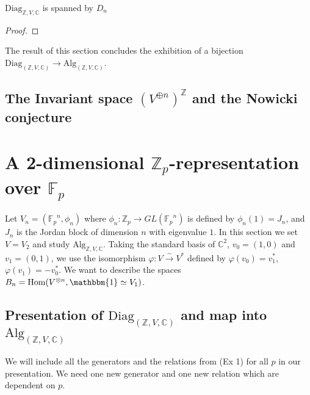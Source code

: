 \documentclass[11pt]{article} %
\begin{document}
\begin{prop}
$\text{Diag}_{\mathbb{Z},V,\mathbb{C}}$ is spanned by $D_n$
\end{prop}
\begin{proof}

\end{proof}
The result of this section concludes the exhibition of a bijection $\text{Diag}_{(\mathbb{Z},V,\mathbb{C})} \rightarrow \text{Alg}_{(\mathbb{Z},V,\mathbb{C})}$.

\subsection{The Invariant space $(V^{\oplus n})^{\mathbb{Z}}$ and the Nowicki conjecture}
\section{A 2-dimensional $\mathbb{Z}_p$-representation over $\mathbb{F}_p$}

Let $V_n=({\mathbb{F}_p}^n,\phi_n)$ where $\phi_n: \mathbb{Z}_p \rightarrow GL({\mathbb{F}_p}^n)$ is defined by $\phi_n(1)=J_n$, and $J_n$ is the Jordan block of dimension $n$ with eigenvalue $1$. In this section we set $V=V_2$ and study $\text{Alg}_{\mathbb{Z},V, \mathbb{C}}$. Taking the standard basis of $\mathbb{C}^2$, $v_0 = (1,0)$ and  $v_1 = (0,1)$, we use the isomorphism $\varphi:V \xrightarrow{\sim} V^{\ast}$ defined by $\varphi(v_0)=v_1^{\ast}$, $\varphi(v_1)=-v_0^{\ast}$. We want to describe the spaces $B_n = \text{Hom}(V^{\otimes n},\mathbbm{1} \simeq V_1)$.

\subsection {Presentation of $\text{Diag}_{(\mathbb{Z},V,\mathbb{C})}$ and map into $\text{Alg}_{(\mathbb{Z},V,\mathbb{C})}$}

We will include all the generators and the relations from (Ex 1) for all $p$ in our presentation. We need one new generator and one new relation which are dependent on $p$.
\end{document}

